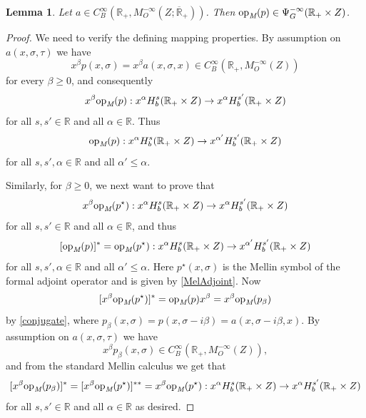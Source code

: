 \documentclass[reqno]{amsart}
\numberwithin{equation}{section}
\newtheorem{lemma}[equation]{Lemma}
\theoremstyle{definition}
\def\R{\mathbb R}
\def\opm{\textup{op}_{\textit{M}}}
\begin{document}
\begin{lemma}
Let $a \in C_B^{\infty}(\R_+,M_{O}^{-\infty}(Z;\overline{\R}_+))$. Then $\opm(p) \in \Psi^{-\infty}_G(\R_+\times Z)$.
\end{lemma}
\begin{proof}
We need to verify the defining mapping properties. By assumption on $a(x,\sigma,\tau)$ we have
$$
x^{\beta} p(x,\sigma) = x^{\beta}a(x,\sigma,x) \in C^{\infty}_B(\R_+,M^{-\infty}_O(Z))
$$
for every $\beta \geq 0$, and consequently
$$
x^{\beta} \opm(p) : x^{\alpha}H^s_b(\R_+\times Z) \to x^{\alpha}H^{s'}_b(\R_+\times Z)
$$
for all $s,s' \in \R$ and all $\alpha \in \R$. Thus
$$
\opm(p) : x^{\alpha}H^s_b(\R_+\times Z) \to x^{\alpha'}H^{s'}_b(\R_+\times Z)
$$
for all $s,s',\alpha \in \R$ and all $\alpha' \leq \alpha$.

Similarly, for $\beta \geq 0$, we next want to prove that
$$
x^{\beta}\opm(p^{\star}) : x^{\alpha}H^s_b(\R_+\times Z) \to x^{\alpha}H^{s'}_b(\R_+\times Z)
$$
for all $s,s' \in \R$ and all $\alpha \in \R$, and thus
$$
[\opm(p)]^* = \opm(p^{\star}) : x^{\alpha}H^s_b(\R_+\times Z) \to x^{\alpha'}H^{s'}_b(\R_+\times Z)
$$
for all $s,s',\alpha \in \R$ and all $\alpha' \leq \alpha$. Here $p^{\star}(x,\sigma)$ is the Mellin symbol of the formal adjoint operator and is given by \eqref{MelAdjoint}. Now
$$
[x^{\beta}\opm(p^{\star})]^* = \opm(p)x^{\beta} = x^{\beta}\opm(p_{\beta})
$$
by \eqref{conjugate}, where $p_{\beta}(x,\sigma) = p(x,\sigma - i\beta) = a(x,\sigma - i\beta,x)$. By assumption on $a(x,\sigma,\tau)$ we have
$$
x^{\beta}p_{\beta}(x,\sigma) \in C^{\infty}_B(\R_+,M^{-\infty}_O(Z)),
$$
and from the standard Mellin calculus we get that
$$
[x^{\beta}\opm(p_{\beta})]^* = [x^{\beta}\opm(p^{\star})]^{**} = x^{\beta}\opm(p^{\star}) : x^{\alpha}H^s_b(\R_+\times Z) \to x^{\alpha}H^{s'}_b(\R_+\times Z)
$$
for all $s,s' \in \R$ and all $\alpha \in \R$ as desired.
\end{proof}
\end{document}
